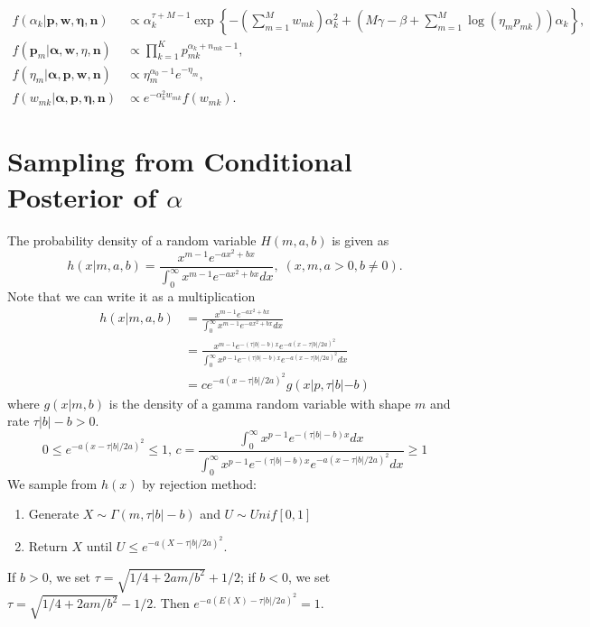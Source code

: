 \documentclass{statsoc}
\newcommand{\p}{\bm{p}}
\newcommand{\w}{\bm{w}}
\newcommand{\eeta}{\bm{\eta}}
\newcommand{\n}{\bm{n}}
\newcommand{\alphavec}{\bm{\alpha}}
\begin{document}
\begin{align*}
f(\alpha_k | \p, \w, \eeta, \n) &\propto  \alpha_k^{\tau + M - 1} \exp\left\{-\left(\sum_{m=1}^Mw_{mk}\right)\alpha_k^2 + \left(M\gamma - \beta + \sum_{m=1}^M \log(\eta_m p_{mk})\right)\alpha_k\right\},\\
f(\p_{m} | \alphavec, \w, \eta, \n) &\propto \prod_{k=1}^K p_{mk}^{\alpha_k+n_{mk}-1},\\
f(\eta_m | \alphavec, \p, \w, \n)  &\propto \eta_m^{\alpha_0 - 1} e^{-\eta_m}, \\
f(w_{mk} | \alphavec, \p, \eeta, \n) &\propto e^{-\alpha_k^2 w_{mk}}f(w_{mk}).
\end{align*} 

\section{Sampling from Conditional Posterior of $\alpha$} \label{sample_alpha}
The probability density of a random variable $H(m, a, b)$ is given as 
$$
h(x|m,a,b) = \frac{x^{m-1}e^{-ax^2+bx}}{\int_0^\infty x^{m-1}e^{-ax^2+bx}dx},\; (x, m,a >0, b\neq 0).
$$
Note that we can write it as a multiplication 
\begin{align*}
h(x|m,a,b) &=   \frac{x^{m-1}e^{-ax^2+bx}}{\int_0^\infty x^{m-1}e^{-ax^2+bx}dx} \\
&=  \frac{x^{m-1}e^{-(\tau|b|-b)x}e^{-a(x - \tau|b|/2a)^2}}{\int_0^\infty x^{p-1}e^{-(\tau|b|-b)x}e^{-a(x - \tau|b|/2a)^2}dx}\\
& = ce^{-a(x - \tau|b|/2a)^2}g(x|p,\tau|b|-b) 
\end{align*}
where $g(x|m,b)$  is the density of a gamma random variable with shape $m$ and rate $\tau|b|-b > 0$. $$0\leq e^{-a(x - \tau|b|/2a)^2} \leq 1,\, c =\frac{\int_0^\infty x^{p-1}e^{-(\tau|b|-b)x}dx}{\int_0^\infty x^{p-1}e^{-(\tau|b|-b)x}e^{-a(x - \tau|b|/2a)^2}dx} \geq 1$$
We sample from $h(x)$ by rejection method: 
\begin{enumerate}
\item Generate $X\sim \Gamma(m, \tau|b|-b)$ and $U\sim Unif[0,1]$
\item Return $X$ until $U \leq e^{-a(X - \tau|b|/2a)^2}$.
\end{enumerate}
If $b>0$, we set $\tau = \sqrt{1/4 + 2am/b^2} + 1/2$; if $b<0$, we set $\tau = \sqrt{1/4 + 2am/b^2} - 1/2$. Then $e^{-a(E(X) - \tau|b|/2a)^2} = 1$.
\end{document}
